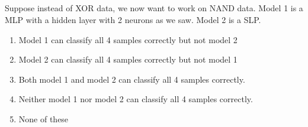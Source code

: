 \begin{frame}
\section{}
Suppose instead of XOR data, we now want to work on NAND data. Model 1 is a MLP with a hidden layer with 2 neurons as we saw. Model 2 is a SLP.
\begin{enumerate}[label=(\Alph*)]
\item Model 1 can classify all 4 samples correctly but not model 2
\item Model 2 can classify all 4 samples correctly but not model 1
\item Both model 1 and model 2 can classify all 4 samples correctly.     %
\item Neither model 1 nor model 2 can classify all 4 samples correctly.
\item None of these  %
\end{enumerate}
\end{frame}
